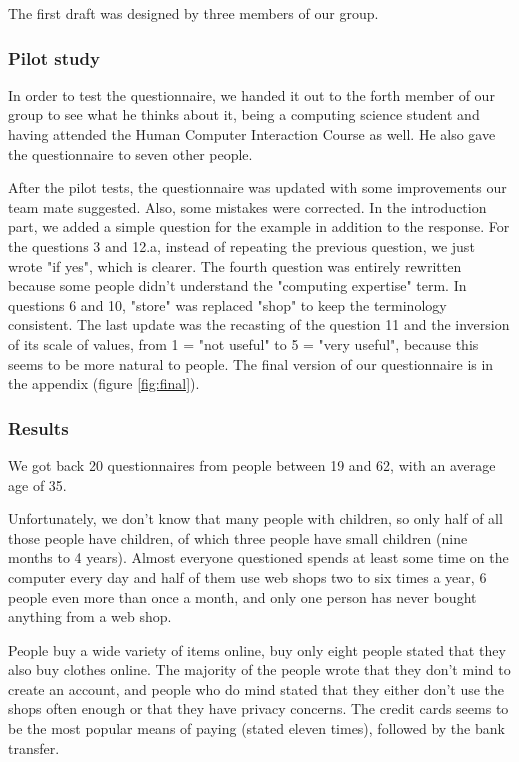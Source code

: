 The first draft was designed by three members of our group.

\subsubsection{Pilot study}
In order to test the questionnaire, we handed it out to the forth member of our group to see what he thinks about it, being a computing science student and having attended the Human Computer Interaction Course as well. He also gave the questionnaire to seven other people.

After the pilot tests, the questionnaire was updated with some improvements our team mate suggested. Also, some mistakes were corrected. In the introduction part, we added a simple question for the example in addition to the response. For the questions 3 and 12.a, instead of repeating the previous question, we just wrote "if yes", which is clearer. The fourth question was entirely rewritten because some people didn't understand the "computing expertise" term. In questions 6 and 10, "store" was replaced "shop" to keep the terminology consistent. The last update was the recasting of the question 11 and the inversion of its scale of values, from 1 = "not useful" to 5 = "very useful", because this seems to be more natural to people. The final version of our questionnaire is in the appendix (figure \ref{fig:final}).

\subsubsection{Results}
We got back 20 questionnaires from people between 19 and 62, with an average age of 35. 

Unfortunately, we don't know that many people with children, so only half of all those people have children, of which three people have small children (nine months to 4 years). Almost everyone questioned spends at least some time on the computer every day and half of them use web shops two to six times a year, 6 people even more than once a month, and only one person has never bought anything from a web shop.

People buy a wide variety of items online, buy only eight people stated that they also buy clothes online. The majority of the people wrote that they don't mind to create an account, and people who do mind stated that they either don't use the shops often enough or that they have privacy concerns.
The credit cards seems to be the most popular means of paying (stated eleven times), followed by the bank transfer.

